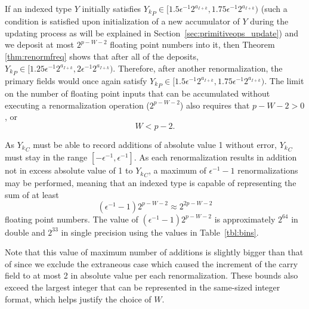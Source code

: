     If an indexed type $Y$ initially satisfies ${Y_k}_P \in [1.5  \epsilon^{-1}
    2^{a_{I + k}}, 1.75  \epsilon^{-1} 2^{a_{I + k}})$
    (such a condition is satisfied upon initialization of a new accumulator of $Y$
    during the updating process as will be explained in Section~\ref{sec:primitiveops_update})
    and we deposit at most
    $2^{p-W-2}$ floating point numbers into it, then Theorem \ref{thm:renormfreq}
    shows that after all of the deposits, ${Y_k}_P \in [1.25  \epsilon^{-1}
    2^{a_{I + k}}, 2  \epsilon^{-1} 2^{a_{I + k}})$. Therefore, after another
    renormalization, the primary fields would once again satisfy ${Y_k}_P \in
    [1.5  \epsilon^{-1} 2^{a_{I + k}}, 1.75  \epsilon^{-1} 2^{a_{I + k}})$.
    The limit on the number of floating point inputs that can be accumulated
    without executing a renormalization operation ($2^{p-W-2}$)
    also requires that $p-W-2 > 0$, or
    \begin{equation}
        W < p - 2.
    \end{equation}

    As ${Y_k}_C$ must be able to record additions of absolute value 1 without
    error, ${Y_k}_C$ must stay in the range $[-\epsilon^{-1}, \epsilon^{-1}]$.
    As each renormalization results in addition not in excess absolute value of
    1 to ${Y_k}_C$, a maximum of $\epsilon^{-1} - 1$ renormalizations may be
    performed, meaning that an indexed type is capable of representing the sum
    of at least
    \begin{equation}
      (\epsilon^{-1} - 1) 2^{p-W-2} \approx 2^{2  p - W - 2}
      \label{eq:totalfreq}
    \end{equation}
    floating point numbers. The value of $(\epsilon^{-1} - 1)2^{p-W-2}$ is approximately $2^{64}$ in double and $2^{33}$ in single
    precision using the values in Table~\ref{tbl:bins}.

    Note that this value of maximum number of additions is slightly bigger
    than that of \cite{repsum} since we exclude the extraneous case which caused
    the increment of the carry field to at most 2 in absolute value per each renormalization.
    These bounds also exceed the largest integer that can be represented
    in the same-sized integer format, which helps justify the choice of $W$.
